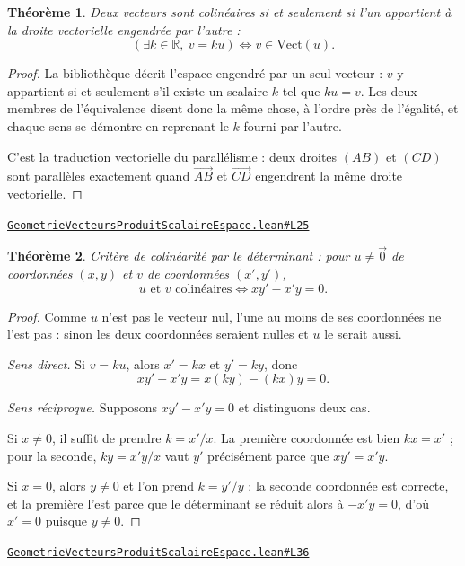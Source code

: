 \documentclass[11pt,a4paper]{article}
\theoremstyle{definition}
\theoremstyle{plain}
\newtheorem{theoreme}{Théorème}
\newcommand{\source}[2]{\par\smallskip\noindent\hfill{\footnotesize\href{#1}{\texttt{#2}}}\par\smallskip}
\begin{document}
\begin{theoreme}
Deux vecteurs sont colinéaires si et seulement si l'un appartient à la droite vectorielle
engendrée par l'autre :
\[ (\exists k \in \mathbb{R},\ v = k u) \iff v \in \mathrm{Vect}(u) . \]
\end{theoreme}

\begin{proof}
La bibliothèque décrit l'espace engendré par un seul vecteur : $v$ y appartient si et
seulement s'il existe un scalaire $k$ tel que $ku = v$. Les deux membres de l'équivalence
disent donc la même chose, à l'ordre près de l'égalité, et chaque sens se démontre en
reprenant le $k$ fourni par l'autre.

\medskip\noindent
C'est la traduction vectorielle du parallélisme : deux droites $(AB)$ et $(CD)$ sont
parallèles exactement quand $\overrightarrow{AB}$ et $\overrightarrow{CD}$ engendrent la
même droite vectorielle.
\end{proof}
\source{https://github.com/Commutator-IO/learn-lean/blob/main/courses/02-lycee/08-geometrie-vecteurs-produit-scalaire-espace/GeometrieVecteursProduitScalaireEspace.lean\#L25}{GeometrieVecteursProduitScalaireEspace.lean\#L25}

\begin{theoreme}
Critère de colinéarité par le déterminant : pour $u \ne \vec 0$ de coordonnées
$(x, y)$ et $v$ de coordonnées $(x', y')$,
\[ u \text{ et } v \text{ colinéaires} \iff xy' - x'y = 0 . \]
\end{theoreme}

\begin{proof}
Comme $u$ n'est pas le vecteur nul, l'une au moins de ses coordonnées ne l'est pas : sinon
les deux coordonnées seraient nulles et $u$ le serait aussi.

\smallskip\noindent
\emph{Sens direct.} Si $v = ku$, alors $x' = kx$ et $y' = ky$, donc
\[ xy' - x'y = x(ky) - (kx)y = 0 . \]

\smallskip\noindent
\emph{Sens réciproque.} Supposons $xy' - x'y = 0$ et distinguons deux cas.

Si $x \ne 0$, il suffit de prendre $k = x'/x$. La première coordonnée est bien
$k x = x'$ ; pour la seconde, $ky = x'y/x$ vaut $y'$ précisément parce que
$xy' = x'y$.

Si $x = 0$, alors $y \ne 0$ et l'on prend $k = y'/y$ : la seconde coordonnée est correcte,
et la première l'est parce que le déterminant se réduit alors à $-x'y = 0$, d'où $x' = 0$
puisque $y \ne 0$.
\end{proof}
\source{https://github.com/Commutator-IO/learn-lean/blob/main/courses/02-lycee/08-geometrie-vecteurs-produit-scalaire-espace/GeometrieVecteursProduitScalaireEspace.lean\#L36}{GeometrieVecteursProduitScalaireEspace.lean\#L36}
\end{document}
